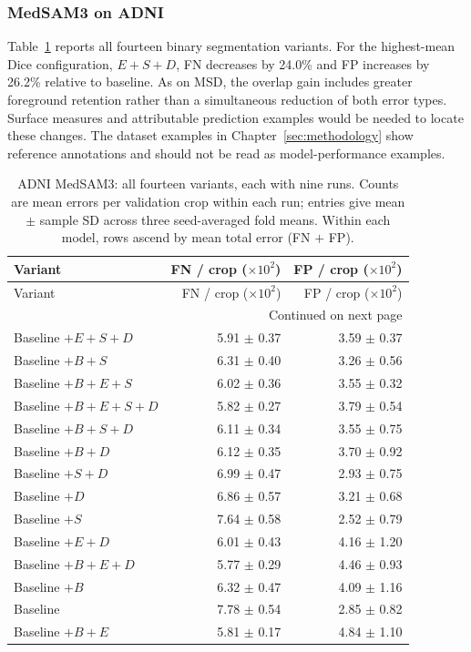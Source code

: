 \documentclass[12pt,a4paper]{article}
\begin{document}
\subsubsection{MedSAM3 on ADNI}

Table~\ref{tab:medsam-adni-all-errors} reports all fourteen binary
segmentation variants. For the highest-mean Dice configuration,
$E+S+D$, FN decreases by 24.0\% and FP increases by 26.2\% relative
to baseline. As on MSD, the overlap gain includes greater foreground
retention rather than a simultaneous reduction of both error types.
Surface measures and attributable prediction examples would be needed
to locate these changes. The dataset examples in
Chapter~\ref{sec:methodology} show reference annotations and should
not be read as model-performance examples.

\begingroup\footnotesize{}
\setlength{\tabcolsep}{4pt}
\renewcommand{\arraystretch}{1.12}
\begin{longtable}{@{}lrr@{}}
\caption{ADNI MedSAM3: all fourteen variants, each with nine runs. Counts are mean errors per validation crop within each run; entries give mean $\pm$ sample SD across three seed-averaged fold means. Within each model, rows ascend by mean total error (FN $+$ FP).}
\label{tab:medsam-adni-all-errors}\\
\hline
Variant & \shortstack{FN / crop\\($\times 10^{2}$)} & \shortstack{FP / crop\\($\times 10^{2}$)} \\ \hline
\endfirsthead
\hline
Variant & \shortstack{FN / crop\\($\times 10^{2}$)} & \shortstack{FP / crop\\($\times 10^{2}$)} \\ \hline
\endhead
\hline
\multicolumn{3}{r}{Continued on next page}\\
\endfoot
\hline\endlastfoot
Baseline $+E+S+D$ & 5.91 $\pm$ 0.37 & 3.59 $\pm$ 0.37 \\
Baseline $+B+S$ & 6.31 $\pm$ 0.40 & 3.26 $\pm$ 0.56 \\
Baseline $+B+E+S$ & 6.02 $\pm$ 0.36 & 3.55 $\pm$ 0.32 \\
Baseline $+B+E+S+D$ & 5.82 $\pm$ 0.27 & 3.79 $\pm$ 0.54 \\
Baseline $+B+S+D$ & 6.11 $\pm$ 0.34 & 3.55 $\pm$ 0.75 \\
Baseline $+B+D$ & 6.12 $\pm$ 0.35 & 3.70 $\pm$ 0.92 \\
Baseline $+S+D$ & 6.99 $\pm$ 0.47 & 2.93 $\pm$ 0.75 \\
Baseline $+D$ & 6.86 $\pm$ 0.57 & 3.21 $\pm$ 0.68 \\
Baseline $+S$ & 7.64 $\pm$ 0.58 & 2.52 $\pm$ 0.79 \\
Baseline $+E+D$ & 6.01 $\pm$ 0.43 & 4.16 $\pm$ 1.20 \\
Baseline $+B+E+D$ & 5.77 $\pm$ 0.29 & 4.46 $\pm$ 0.93 \\
Baseline $+B$ & 6.32 $\pm$ 0.47 & 4.09 $\pm$ 1.16 \\
Baseline & 7.78 $\pm$ 0.54 & 2.85 $\pm$ 0.82 \\
Baseline $+B+E$ & 5.81 $\pm$ 0.17 & 4.84 $\pm$ 1.10 \\
\end{longtable}
\endgroup
\end{document}

